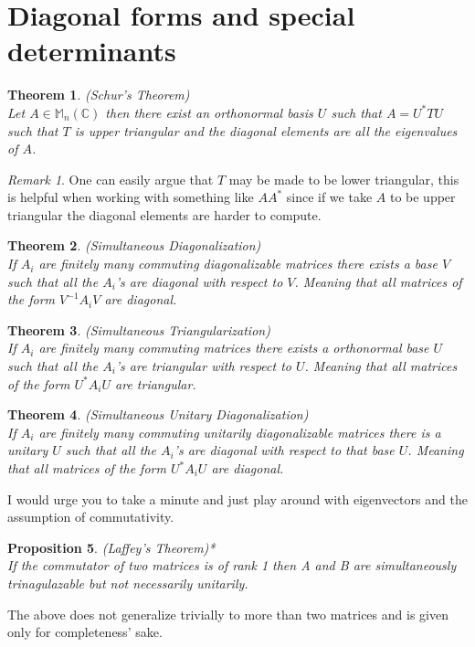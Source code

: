 \documentclass[12pt]{article}
\newtheorem{theorem}{Theorem}[section]
\newtheorem{prop}[theorem]{Proposition}
\theoremstyle{definition}
\theoremstyle{remark}
\newtheorem*{remark}{Remark}
\theoremstyle{plain}
\begin{document}
\section{Diagonal forms and special determinants}
\begin{theorem}\textup{(Schur's Theorem)}\\
	Let $A\in \mathbb{M}_n(\mathbb{C})$ then there exist an orthonormal basis $U$ such that $A=U^*TU$ such that $T$ is upper triangular and the diagonal elements are all the eigenvalues of $A$.
\end{theorem}
\begin{remark}
	One can easily argue that $T$ may be made to be lower triangular, this is helpful when working with something like $AA^*$ since if we take $A$ to be upper triangular the diagonal elements are harder to compute.
\end{remark}
\begin{theorem}\textup{(Simultaneous Diagonalization)}\\
	If $A_i$ are finitely many commuting diagonalizable matrices there exists a base $V$ such that all the $A_i$'s are diagonal with respect to $V$. Meaning that all matrices of the form $ V^{-1} A_i V $ are diagonal.
\end{theorem}
\begin{theorem}\textup{(Simultaneous Triangularization)}\\
	If $A_i$ are finitely many commuting matrices there exists a orthonormal base $U$ such that all the $A_i$'s are triangular with respect to $U$. Meaning that all matrices of the form $ U^{*} A_i U $ are triangular.
\end{theorem}
\begin{theorem}\textup{(Simultaneous Unitary Diagonalization)}\\
	If $A_i$ are finitely many commuting unitarily diagonalizable matrices there is a unitary $U$ such that all the $A_i$'s are diagonal with respect to that base $U $. Meaning that all matrices of the form $ U^{*} A_i U $ are diagonal.
\end{theorem}
I would urge you to take a minute and just play around with eigenvectors and the assumption of commutativity.
\begin{prop}\textup{(Laffey's Theorem)*}\\
    If the commutator of two matrices is of rank 1 then A and B are simultaneously trinagulazable but not necessarily unitarily.
\end{prop}
The above does not generalize trivially to more than two matrices and is given only for completeness' sake.
\end{document}

